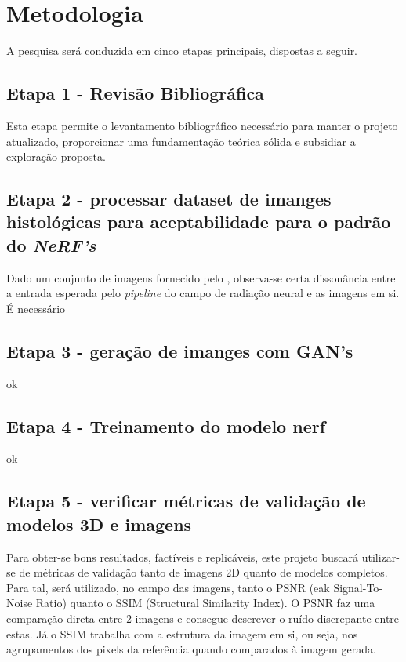 \section{Metodologia}

A pesquisa será conduzida em cinco etapas principais, dispostas a seguir.


\subsection{Etapa 1 - Revisão Bibliográfica}

Esta etapa permite o levantamento bibliográfico necessário para manter o projeto atualizado, proporcionar uma fundamentação teórica sólida e subsidiar a exploração proposta.



\subsection{Etapa 2 - processar dataset de imanges histológicas para aceptabilidade para o padrão do \textit{NeRF's}}

  Dado um conjunto de imagens fornecido pelo %
  , observa-se certa dissonância entre a entrada esperada pelo \textit{pipeline} do campo de radiação neural e as imagens em si. É necessário %

\subsection{Etapa 3 - geração de imanges com GAN's}

ok

\subsection{Etapa 4 - Treinamento do modelo nerf}

ok 

\subsection{Etapa 5 - verificar métricas de validação de modelos 3D e imagens}

Para obter-se bons resultados, factíveis e replicáveis, este projeto buscará utilizar-se de métricas de validação tanto de imagens 2D quanto de modelos completos. Para tal, será utilizado, no campo das imagens, tanto o PSNR (eak Signal-To-Noise Ratio) quanto o SSIM (Structural Similarity Index). O PSNR faz uma comparação direta entre 2 imagens e consegue descrever o ruído discrepante entre estas. Já o SSIM trabalha com a estrutura da imagem em si, ou seja, nos agrupamentos dos pixels da referência quando comparados à imagem gerada. 

